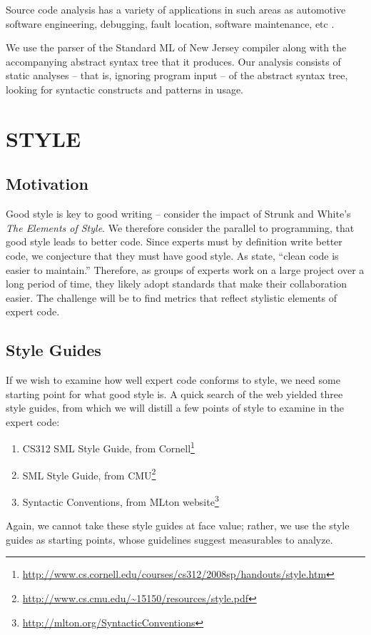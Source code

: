 \documentclass[12pt,abstracton]{scrartcl}
\begin{document}
Source code analysis has a variety of applications in such areas as
automotive software engineering, debugging, fault location, software maintenance,
etc \cite{Bin07}.

We use the parser of the Standard ML of New Jersey compiler along with the accompanying
abstract syntax tree that it produces. Our analysis
consists of static analyses -- that is, ignoring program input -- of the abstract syntax tree, looking for
syntactic constructs and patterns in usage.
\section{STYLE}\label{sec:style}
\subsection{Motivation}\label{subsec:style}
Good style is key to good writing -- consider the impact
of Strunk and White's \emph{The Elements of Style}.
We therefore consider the parallel to programming, that
good style leads to better code. Since experts must by
definition write better code, we conjecture that they
must have good style. 
As \cite{Ker78} state, ``clean code is easier to maintain.''
Therefore, as groups of experts work on a large project over
a long period of time, they likely adopt standards that
make their collaboration easier.
The challenge will be to find metrics that reflect stylistic elements of expert code.
\subsection{Style Guides}\label{subsec:guide}
If we wish to examine how well expert code conforms to style, we need some starting point for
what good style is. A quick search of the web yielded three style guides, from which
we will distill a few points of style to examine in the expert code:
\begin{enumerate}
\item CS312 SML Style Guide, from Cornell\footnote{\url{http://www.cs.cornell.edu/courses/cs312/2008sp/handouts/style.htm}}
\item SML Style Guide, from CMU\footnote{\url{http://www.cs.cmu.edu/~15150/resources/style.pdf}}
\item Syntactic Conventions, from MLton website\footnote{\url{http://mlton.org/SyntacticConventions}}
\end{enumerate}

Again, we cannot take these style guides at face value; rather, we use
the style guides as starting points, whose guidelines suggest measurables
to analyze.
\end{document}
